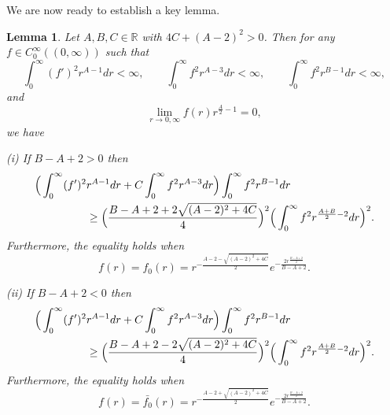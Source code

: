 \documentclass[a4paper,12pt]{article}
\theoremstyle{plain}
\newtheorem{lemma}[theorem]{Lemma}
\theoremstyle{definition}
\theoremstyle{remark}
\def\R{\mathbb R}%
\numberwithin{equation}{section}
\begin{document}
We are now ready to establish a key lemma.
\begin{lemma}\label{modelineq}
Let $A, B, C \in \R$ with $4C + (A-2)^2 >0$. Then for any $f \in C_0^\infty((0,\infty))$ such that
\[
\int_0^\infty (f')^2 r^{A -1} dr < \infty,\qquad \int_0^\infty f^2 r^{A -3} dr < \infty, \qquad \int_0^\infty f^2 r^{B-1} dr < \infty,
\]
and 
\[
\lim_{r\to 0, \infty} f(r) r^{\frac A2 -1} = 0,
\]
we have
\begin{description}
\item(i) If $B-A+2 > 0$ then
\begin{align}\label{eq:model1}
\Big(\int_0^\infty (f')^2& r^{A -1} dr + C \int_0^\infty f^2 r^{A -3} dr\Big) \int_0^\infty f^2 r^{B-1} dr\notag\\
&\geq  \Big(\frac{B-A+2 + 2\sqrt{(A-2)^2 + 4C}}4\Big)^2 \Big(\int_0^\infty f^2 r^{\frac{A+B}2-2} dr\Big)^2.
\end{align}
Furthermore, the equality holds when 
\begin{equation}\label{eq:extre1}
f(r)=f_0(r) = r^{-\frac{A-2 - \sqrt{(A-2)^2 + 4C}}2} e^{-\frac{2r^{\frac{B-A+2}2}}{B-A+2}}.
\end{equation}
\item(ii) If $B-A+2 < 0$ then
\begin{align}\label{eq:model2}
\Big(\int_0^\infty (f')^2& r^{A -1} dr + C \int_0^\infty f^2 r^{A -3} dr\Big) \int_0^\infty f^2 r^{B-1} dr\notag\\
&\geq  \Big(\frac{B-A+2 - 2\sqrt{(A-2)^2 + 4C}}4\Big)^2 \Big(\int_0^\infty f^2 r^{\frac{A+B}2-2} dr\Big)^2.
\end{align}
Furthermore, the equality holds when 
\begin{equation}\label{eq:extre2}
f(r)=\bar{f_0}(r) = r^{-\frac{A-2 +\sqrt{(A-2)^2 + 4C}}2} e^{-\frac{2r^{\frac{B-A+2}2}}{B-A+2}}.
\end{equation}
\end{description}
\end{lemma}
\end{document}
